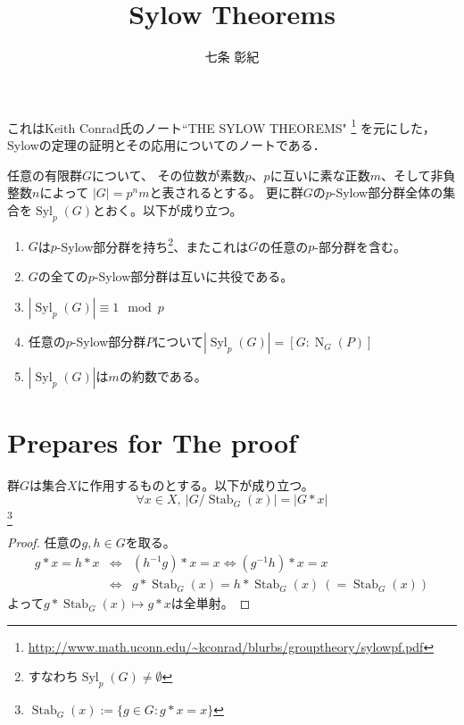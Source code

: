 \documentclass[a4paper]{jarticle}
\title{Sylow Theorems}
\author{七条 彰紀}
\newcommand{\Stab}{\operatorname{Stab}}
\newcommand{\Norm}{\operatorname{N}}
\newcommand{\Syl}{\operatorname{Syl}}
\begin{document}
\maketitle
これはKeith Conrad氏のノート``THE SYLOW THEOREMS"
\footnote{\url{http://www.math.uconn.edu/~kconrad/blurbs/grouptheory/sylowpf.pdf}}
を元にした，Sylowの定理の証明とその応用についてのノートである．

\begin{Them}
    任意の有限群$G$について、
    その位数が素数$p$、$p$に互いに素な正数$m$、そして非負整数$n$によって
    $|G|=p^{n}m$と表されるとする。
    更に群$G$の$p$-Sylow部分群全体の集合を$\Syl_p(G)$とおく。以下が成り立つ。
    \begin{enumerate}
        \renewcommand{\labelenumi}{\Roman{enumi}.}
        \item $G$は$p$-Sylow部分群を持ち\footnote{すなわち$\Syl_p(G) \neq \emptyset$}、またこれは$G$の任意の$p$-部分群を含む。
        \item $G$の全ての$p$-Sylow部分群は互いに共役である。
        \item $|\Syl_p(G)| \equiv 1 \mod p$
        \item 任意の$p$-Sylow部分群$P$について$|\Syl_p(G)| = [G:\Norm_G(P)]$
        \item $|\Syl_p(G)|$は$m$の約数である。
    \end{enumerate}
\end{Them}

\section{Prepares for The proof}
    \begin{Them}
        群$G$は集合$X$に作用するものとする。以下が成り立つ。
        \[ \forall x \in  X,~ |G / \Stab_G(x)|=|G \ast x| \]
        \footnote{$\Stab_G(x):=\{g \in G : g \ast x=x \}$}
    \end{Them}
    \begin{proof}
        任意の$g, h \in G$を取る。
        \begin{eqnarray*}
            g \ast x=h \ast x
                &\iff& (h^{-1}g) \ast x=x \iff (g^{-1}h) \ast x=x \\
                &\iff& g \ast \Stab_G(x)= h \ast \Stab_G(x) ~(=\Stab_G(x))
        \end{eqnarray*}
        よって$g \ast \Stab_G(x) \mapsto g \ast x$は全単射。
    \end{proof}
\end{document}
